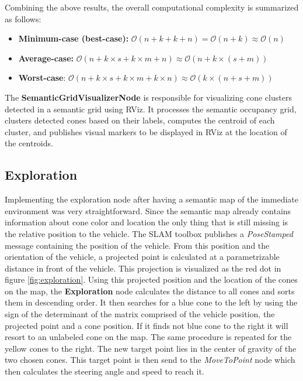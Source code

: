 \begin{itemize}
\end{itemize}

Combining the above results, the overall computational complexity is summarized as follows:

\begin{itemize}
    \item \textbf{Minimum-case (best-case):} $\mathcal{O}(n + k + k + n) = \mathcal{O}(n + k)\approx \mathcal{O}(n)$

    \item \textbf{Average-case:} $\mathcal{O}(n + k \times s + k \times m + n) \approx \mathcal{O}(n + k \times (s + m))$

    \item \textbf{Worst-case}: $\mathcal{O}(n + k \times s + k \times m + k \times n) \approx \mathcal{O}(k \times (n + s + m))$
\end{itemize}

The \textbf{SemanticGridVisualizerNode} is responsible for visualizing cone clusters detected in a semantic grid using RViz. It processes the semantic occupancy grid, clusters detected cones based on their labels, computes the centroid of each cluster, and publishes visual markers to be displayed in RViz at the location of the centroids.\\


\subsection{Exploration}

Implementing the exploration node after having a semantic map of the immediate environment was very straightforward. Since the semantic map already contains information about cone color and location the only thing that is still missing is the relative position to the vehicle. The SLAM toolbox publishes a \textit{PoseStamped} message containing the position of the vehicle. From this position and the orientation of the vehicle, a projected point is calculated at a parametrizable distance in front of the vehicle. This projection is visualized as the red dot in figure \ref{fig:exploration}. Using this projected position and the location of the cones on the map, the \textbf{Exploration} node calculates the distance to all cones and sorts them in descending order. It then searches for a blue cone to the left by using the sign of the determinant of the matrix comprised of the vehicle position, the projected point and a cone position. If it finds not blue cone to the right it will resort to an unlabeled cone on the map. The same procedure is repeated for the yellow cones to the right. The new target point lies in the center of gravity of the two chosen cones. This target point is then send to the \textit{MoveToPoint} node which then calculates the steering angle and speed to reach it.

